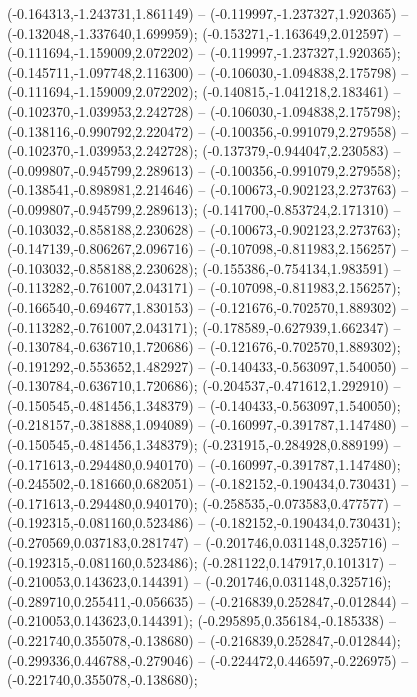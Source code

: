  (-0.164313,-1.243731,1.861149) -- (-0.119997,-1.237327,1.920365) -- (-0.132048,-1.337640,1.699959);
 (-0.153271,-1.163649,2.012597) -- (-0.111694,-1.159009,2.072202) -- (-0.119997,-1.237327,1.920365);
 (-0.145711,-1.097748,2.116300) -- (-0.106030,-1.094838,2.175798) -- (-0.111694,-1.159009,2.072202);
 (-0.140815,-1.041218,2.183461) -- (-0.102370,-1.039953,2.242728) -- (-0.106030,-1.094838,2.175798);
 (-0.138116,-0.990792,2.220472) -- (-0.100356,-0.991079,2.279558) -- (-0.102370,-1.039953,2.242728);
 (-0.137379,-0.944047,2.230583) -- (-0.099807,-0.945799,2.289613) -- (-0.100356,-0.991079,2.279558);
 (-0.138541,-0.898981,2.214646) -- (-0.100673,-0.902123,2.273763) -- (-0.099807,-0.945799,2.289613);
 (-0.141700,-0.853724,2.171310) -- (-0.103032,-0.858188,2.230628) -- (-0.100673,-0.902123,2.273763);
 (-0.147139,-0.806267,2.096716) -- (-0.107098,-0.811983,2.156257) -- (-0.103032,-0.858188,2.230628);
 (-0.155386,-0.754134,1.983591) -- (-0.113282,-0.761007,2.043171) -- (-0.107098,-0.811983,2.156257);
 (-0.166540,-0.694677,1.830153) -- (-0.121676,-0.702570,1.889302) -- (-0.113282,-0.761007,2.043171);
 (-0.178589,-0.627939,1.662347) -- (-0.130784,-0.636710,1.720686) -- (-0.121676,-0.702570,1.889302);
 (-0.191292,-0.553652,1.482927) -- (-0.140433,-0.563097,1.540050) -- (-0.130784,-0.636710,1.720686);
 (-0.204537,-0.471612,1.292910) -- (-0.150545,-0.481456,1.348379) -- (-0.140433,-0.563097,1.540050);
 (-0.218157,-0.381888,1.094089) -- (-0.160997,-0.391787,1.147480) -- (-0.150545,-0.481456,1.348379);
 (-0.231915,-0.284928,0.889199) -- (-0.171613,-0.294480,0.940170) -- (-0.160997,-0.391787,1.147480);
 (-0.245502,-0.181660,0.682051) -- (-0.182152,-0.190434,0.730431) -- (-0.171613,-0.294480,0.940170);
 (-0.258535,-0.073583,0.477577) -- (-0.192315,-0.081160,0.523486) -- (-0.182152,-0.190434,0.730431);
 (-0.270569,0.037183,0.281747) -- (-0.201746,0.031148,0.325716) -- (-0.192315,-0.081160,0.523486);
 (-0.281122,0.147917,0.101317) -- (-0.210053,0.143623,0.144391) -- (-0.201746,0.031148,0.325716);
 (-0.289710,0.255411,-0.056635) -- (-0.216839,0.252847,-0.012844) -- (-0.210053,0.143623,0.144391);
 (-0.295895,0.356184,-0.185338) -- (-0.221740,0.355078,-0.138680) -- (-0.216839,0.252847,-0.012844);
 (-0.299336,0.446788,-0.279046) -- (-0.224472,0.446597,-0.226975) -- (-0.221740,0.355078,-0.138680);
